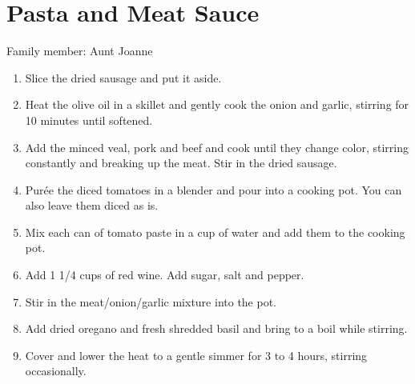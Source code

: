 \chapter{Pasta and Meat Sauce}
\label{ch:hamquiche}

Family member: Aunt Joanne



\begin{enumerate}
    \item Slice the dried sausage and put it aside.
    \item Heat the olive oil in a skillet and gently cook the onion and garlic, stirring for 10 minutes until softened.
    \item Add the minced veal, pork and beef and cook until they change color, stirring constantly and breaking up the meat. Stir in the dried sausage.
    \item Purée the diced tomatoes in a blender and pour into a cooking pot. You can also leave them diced as is.
    \item Mix each can of tomato paste in a cup of water and add them to the cooking pot.
    \item Add 1 1/4 cups of red wine. Add sugar, salt and pepper.
    \item Stir in the meat/onion/garlic mixture into the pot.
    \item Add dried oregano and fresh shredded basil and bring to a boil while stirring.
    \item Cover and lower the heat to a gentle simmer for 3 to 4 hours, stirring occasionally.
\end{enumerate}

